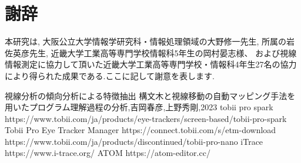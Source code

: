\documentclass[paper=a4paper,fontsize=11pt]{jlreq}
\begin{document}
\pagebreak

\part{謝辞}
本研究は,
大阪公立大学情報学研究科・情報処理領域の大野修一先生,
所属の岩佐英彦先生,
近畿大学工業高等専門学校情報科5年生の岡村晏志様、
および視線情報測定に協力して頂いた近畿大学工業高等専門学校・情報科4年生27名の協力により得られた成果である.ここに記して謝意を表します.

\pagebreak

\begin{thebibliography}{99}
   視線分析の傾向分析による特徴抽出
   構文木と視線移動の自動マッピング手法を用いたプログラム理解過程の分析,吉岡春彦,上野秀剛,2023
   tobii pro spark https://www.tobii.com/ja/products/eye-trackers/screen-based/tobii-pro-spark
   Tobii Pro Eye Tracker Manager https://connect.tobii.com/s/etm-download
   https://www.tobii.com/ja/products/discontinued/tobii-pro-nano
   iTrace https://www.i-trace.org/
   ATOM https://atom-editor.cc/
\end{thebibliography}
\end{document}
